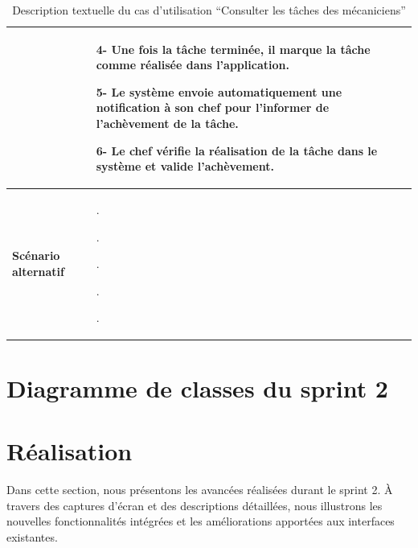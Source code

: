 \begin{table}[htbp]
  \centering
  \renewcommand{\arraystretch}{1.7} %
  \begin{tabular}{|p{4cm}|p{9cm}|}

                                 & 4- Une fois la tâche terminée, il marque la tâche comme réalisée dans l'application.\newline

    5- Le système envoie automatiquement une notification à son chef pour l'informer de l'achèvement de la tâche.\newline

    6- Le chef vérifie la réalisation de la tâche dans le système et valide l'achèvement.                                       \\


    \hline
    \textbf{Scénario alternatif} & .\newline

    . \newline

    .\newline

    .\newline 
    
    .\\

    \hline
  \end{tabular}
  \caption{Description textuelle du cas d’utilisation “Consulter les tâches des mécaniciens”}

\end{table}



\newpage
\section{Diagramme de classes du sprint 2}

\newpage
\section{ Réalisation}
\bigskip

Dans cette section, nous présentons les avancées réalisées durant le sprint 2. À travers des captures d’écran et des descriptions détaillées, nous illustrons les nouvelles fonctionnalités intégrées et les améliorations apportées aux interfaces existantes.

